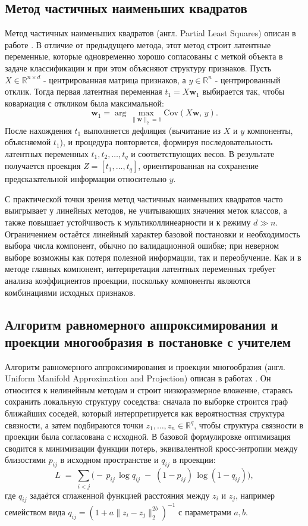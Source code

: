 \documentclass[12pt,a4paper]{article}
\begin{document}
\subsection{Метод частичных наименьших квадратов}
Метод частичных наименьших квадратов (англ. Partial Least Squares) описан в работе 
\cite{WoldRuhe1984}. В отличие от предыдущего метода, этот метод строит латентные переменные, 
которые одновременно хорошо согласованы с меткой объекта в задаче классификации и при этом 
объясняют структуру признаков. Пусть $X \in \mathbb{R}^{n \times d}$ - центрированная матрица 
признаков, а $y \in \mathbb{R}^{n}$ - центрированный отклик. Тогда первая латентная переменная 
$t_1 = X\mathbf{w}_1$ выбирается так, чтобы ковариация с откликом была максимальной:
\begin{equation}
\mathbf{w}_1 = \arg\max_{\|\mathbf{w}\|_2=1} \mathrm{Cov}(X\mathbf{w},\,y).
\end{equation}
После нахождения $t_1$ выполняется дефляция (вычитание из $X$ и $y$ компоненты, объясняемой $t_1$), 
и процедура повторяется, формируя последовательность латентных переменных $t_1,t_2,\dots,t_q$ и 
соответствующих весов. В результате получается проекция $Z=[t_1,\dots,t_q]$, ориентированная на 
сохранение предсказательной информации относительно $y$.

С практической точки зрения метод частичных наименьших квадратов часто выигрывает у 
линейных методов, не учитывающих значения меток классов, а также повышает устойчивость к 
мультиколлинеарности и к режиму $d \gg n$. Ограничением остаётся линейный 
характер базовой постановки и необходимость выбора числа компонент, обычно по валидационной 
ошибке; при неверном выборе возможны как потеря полезной информации, так и переобучение. 
Как и в методе главных компонент, интерпретация латентных переменных требует анализа 
коэффициентов проекции, поскольку компоненты являются комбинациями исходных признаков.

\subsection{Алгоритм равномерного аппроксимирования и проекции многообразия в постановке с 
учителем}
Алгоритм равномерного аппроксимирования и проекции многообразия (англ. Uniform Manifold 
Approximation and Projection) описан в работах \cite{McInnes2018arXiv,McInnes2018JOSS}. 
Он относится к нелинейным методам и строит низкоразмерное вложение, стараясь сохранить локальную 
структуру соседства: сначала по выборке строится граф ближайших соседей, который интерпретируется 
как вероятностная структура связности, а затем подбираются точки $z_1,\dots,z_n \in \mathbb{R}^q$, 
чтобы структура связности в проекции была согласована с исходной. В базовой формулировке 
оптимизация сводится к минимизации функции потерь, эквивалентной кросс-энтропии между 
близостями $p_{ij}$ в исходном пространстве и $q_{ij}$ в проекции:
\begin{equation}
L \;=\; \sum_{i<j}\Big( -\,p_{ij}\,\log q_{ij} \;-\; (1-p_{ij})\,\log(1-q_{ij}) \Big),
\end{equation}
где $q_{ij}$ задаётся сглаженной функцией расстояния между $z_i$ и $z_j$, например семейством 
вида $q_{ij} = (1 + a\|z_i-z_j\|_2^{2b})^{-1}$ с параметрами $a,b$.
\end{document}
